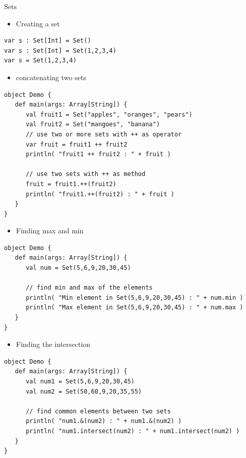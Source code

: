 \documentclass[presentation, aspectratio=169]{beamer}
\begin{document}
\begin{frame}{Sets}
 \begin{itemize}
\item Creating a set
\end{itemize}
\tiny
\begin{verbatim}
var s : Set[Int] = Set()
var s : Set[Int] = Set(1,2,3,4)
var s = Set(1,2,3,4)
\end{verbatim}
\large
\begin{itemize}
\item concatenating two sets
\end{itemize}
\tiny
\begin{verbatim}
object Demo {
   def main(args: Array[String]) {
      val fruit1 = Set("apples", "oranges", "pears")
      val fruit2 = Set("mangoes", "banana")
      // use two or more sets with ++ as operator
      var fruit = fruit1 ++ fruit2
      println( "fruit1 ++ fruit2 : " + fruit )

      // use two sets with ++ as method
      fruit = fruit1.++(fruit2)
      println( "fruit1.++(fruit2) : " + fruit )
   }
}

\end{verbatim}
\large
\begin{itemize}
\item Finding max and min
\end{itemize}
\tiny
\begin{verbatim}
object Demo {
   def main(args: Array[String]) {
      val num = Set(5,6,9,20,30,45)

      // find min and max of the elements
      println( "Min element in Set(5,6,9,20,30,45) : " + num.min )
      println( "Max element in Set(5,6,9,20,30,45) : " + num.max )
   }
}

\end{verbatim}
\large
\begin{itemize}
\item Finding the intersection
\end{itemize}
\tiny
\begin{verbatim}
object Demo {
   def main(args: Array[String]) {
      val num1 = Set(5,6,9,20,30,45)
      val num2 = Set(50,60,9,20,35,55)

      // find common elements between two sets
      println( "num1.&(num2) : " + num1.&(num2) )
      println( "num1.intersect(num2) : " + num1.intersect(num2) )
   }
}
\end{verbatim}
\end{frame}
\end{document}
